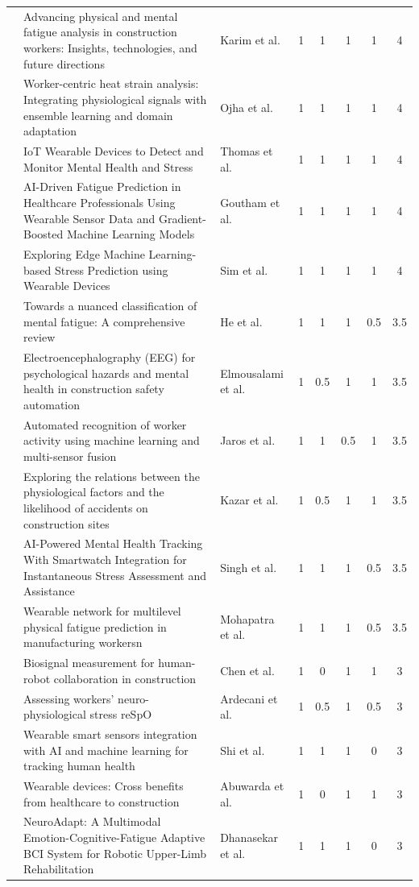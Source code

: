 \begin{center}
\begin{longtable}{p{1.5cm} p{4cm} p{2.0cm} c c c c c}
\cite{karim2025} & Advancing physical and mental fatigue analysis in construction workers: Insights, technologies, and future directions & Karim et al. & 1 & 1 & 1 & 1 & 4 \\
\cite{ojha2024} & Worker-centric heat strain analysis: Integrating physiological signals with ensemble learning and domain adaptation & Ojha et al. & 1 & 1 & 1 & 1 & 4 \\
\cite{thomas2025} & IoT Wearable Devices to Detect and Monitor Mental Health and Stress & Thomas et al. & 1 & 1 & 1 & 1 & 4 \\
\cite{goutham2025} & AI-Driven Fatigue Prediction in Healthcare Professionals Using Wearable Sensor Data and Gradient-Boosted Machine Learning Models & Goutham et al. & 1 & 1 & 1 & 1 & 4 \\
\cite{sim2023} & Exploring Edge Machine Learning-based Stress Prediction using Wearable Devices & Sim et al. & 1 & 1 & 1 & 1 & 4 \\
\cite{he2025} & Towards a nuanced classification of mental fatigue: A comprehensive review & He et al. & 1 & 1 & 1 & 0.5 & 3.5 \\
\cite{elmousalami2025} & Electroencephalography (EEG) for psychological hazards and mental health in construction safety automation & Elmousalami et al. & 1 & 0.5 & 1 & 1 & 3.5 \\
\cite{jaros2025} & Automated recognition of worker activity using machine learning and multi-sensor fusion & Jaros et al. & 1 & 1 & 0.5 & 1 & 3.5 \\

\cite{kazar2021} & Exploring the relations between the physiological factors and the likelihood of accidents on construction sites & Kazar et al. & 1 & 0.5 & 1 & 1 & 3.5 \\
\cite{singh2025} & AI-Powered Mental Health Tracking With Smartwatch Integration for Instantaneous Stress Assessment and Assistance & Singh et al. & 1 & 1 & 1 & 0.5 & 3.5 \\
\cite{mohapatra2024} & Wearable network for multilevel physical fatigue prediction in manufacturing workersn & Mohapatra et al. & 1 & 1 & 1 & 0.5 & 3.5 \\
\cite{chen2025} & Biosignal measurement for human-robot collaboration in construction & Chen et al. & 1 & 0 & 1 & 1 & 3 \\
\cite{ardecani2025} & Assessing workers’ neuro-physiological stress reSpO & Ardecani et al. & 1 & 0.5 & 1 & 0.5 & 3 \\
\cite{xianyong2025} & Wearable smart sensors integration with AI and machine learning for tracking human health & Shi et al. & 1 & 1 & 1 & 0 & 3 \\
\cite{abuwarda2022} & Wearable devices: Cross benefits from healthcare to construction & Abuwarda et al. & 1 & 0 & 1 & 1 & 3 \\
\cite{dhanasekar2025} & NeuroAdapt: A Multimodal Emotion-Cognitive-Fatigue Adaptive BCI System for Robotic Upper-Limb Rehabilitation  & Dhanasekar et al. & 1 & 1 & 1 & 0 & 3 \\


\end{longtable}
\end{center}
